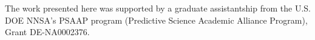 \documentclass{anstrans}
\begin{document}
The work presented here was supported by a graduate assistantship from the U.S. DOE NNSA's PSAAP program (Predictive Science Academic Alliance Program), Grant DE-NA0002376.  



\end{document}

